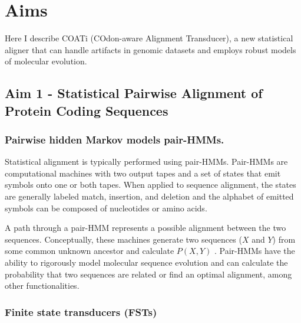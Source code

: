 \section{Aims}
Here I describe COATi (COdon-aware Alignment Transducer), a new statistical
aligner that can handle artifacts in genomic datasets and employs robust models
of molecular evolution.

\subsection{Aim 1 - Statistical Pairwise Alignment of Protein Coding Sequences}

\subsubsection{Pairwise hidden Markov models pair-HMMs.}
Statistical alignment is typically performed using pair-HMMs.
Pair-HMMs are computational machines with two output tapes and a set of states
that emit symbols onto one or both tapes.
When applied to sequence alignment, the states are generally labeled match,
insertion, and deletion and the alphabet of emitted symbols can be composed of
nucleotides or amino acids.

A path through a pair-HMM represents a possible alignment between the two
sequences.
Conceptually, these machines generate two sequences ($X$ and $Y$) from some
common unknown ancestor and calculate $P(X,Y)$
\parencite{yoon_2009_hmm}.
Pair-HMMs have the ability to rigorously model molecular sequence evolution and
can calculate the probability that two sequences are related or find an optimal
alignment, among other functionalities.

\subsubsection{Finite state transducers (FSTs)}


